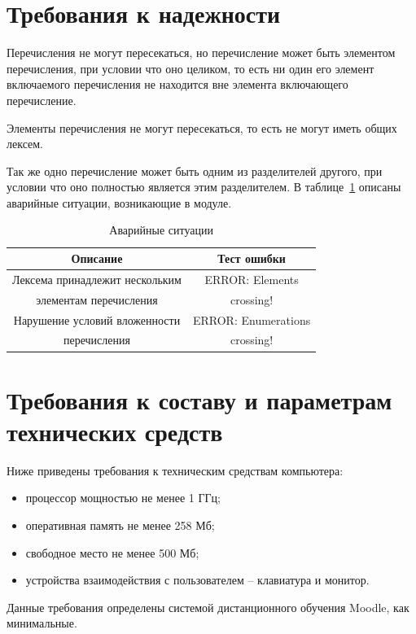 \documentclass[a4paper,english]{G2-105}
\begin{document}
\section{Требования к надежности}

\par Перечисления не могут пересекаться, но перечисление может быть элементом перечисления,
при условии что оно целиком, то есть ни один его элемент включаемого перечисления не находится вне элемента включающего перечисление. 
\par Элементы перечисления не могут пересекаться, то есть не могут иметь общих лексем.
\par Так же одно перечисление может быть одним из разделителей другого, при условии что
оно полностью является этим разделителем.
В таблице~\ref{errors} описаны аварийные ситуации, возникающие в модуле.
\begin{longtable}{|c|c|}
    \caption{Аварийные ситуации} \label{errors} \\ \hline
    Описание & Тест ошибки \\ \hline \endhead
    Лексема принадлежит нескольким & ERROR: Elements \\ 
    элементам перечисления         & crossing! \\ \hline
    Нарушение условий вложенности  & ERROR: Enumerations \\ 
    перечисления                   & crossing! \\
\end{longtable}

\section{Требования к составу и параметрам технических средств}

\par Ниже приведены требования к техническим средствам компьютера:
\begin{itemize}
\item процессор мощностью не менее 1 ГГц;
\item оперативная память не менее 258 Мб;
\item свободное место не менее 500 Мб;
\item устройства взаимодействия с пользователем – клавиатура и монитор.
\end{itemize}
\par Данные требования определены системой дистанционного обучения Moodle, как минимальные.
\end{document}
